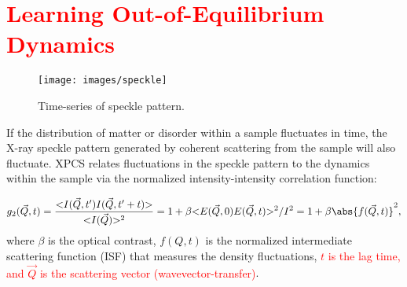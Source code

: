 \section{\textcolor{red}{Learning Out-of-Equilibrium Dynamics} }

\begin{wrapfigure}[9]{r}{2.9in}
  \vspace{-30pt}
  \begin{center}
\texttt{[image: images/speckle]}
  \end{center}
  \vspace{-20pt}
  \caption{\footnotesize Time-series of speckle pattern.}
\label{speckle}
  \vspace{-10pt}
\end{wrapfigure}

If the distribution of matter or disorder within a sample fluctuates in time, the X-ray speckle pattern generated by coherent scattering from the sample will also fluctuate. XPCS relates fluctuations
in the speckle pattern to the dynamics within the sample via the normalized intensity-intensity correlation
function:

\begin{equation}
g_2(\vec{Q},t)=\frac{\mathopen{<}I(\vec{Q},t')I(\vec{Q},t'+t) \mathclose{>}}{\mathopen{<}I(\vec{Q})\mathclose{>}^2}= 1+\beta\mathopen{<}E(\vec{Q},0)E(\vec{Q},t)\mathclose{>}^2/I^2=1+\beta\abs{f(\vec{Q},t)}^2,
\label{g2}
\end{equation}
where $\beta$ is the optical contrast, $f(Q,t)$ is the normalized intermediate scattering function (ISF) that measures the density fluctuations, \textcolor{red}{$t$ is the lag time, and $\vec{Q}$ is the scattering vector (wavevector-transfer)}.




